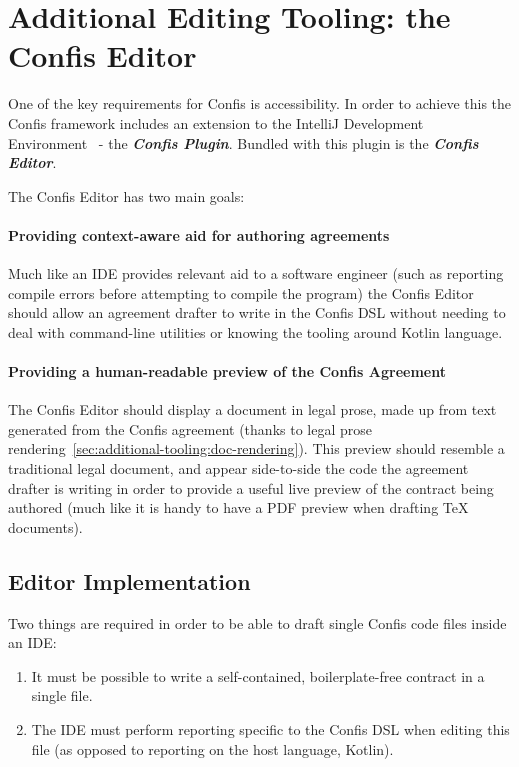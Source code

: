 \section[The Confis Editor]{Additional Editing Tooling: the Confis Editor}\label{sec:confis-editor}

One of the key requirements for Confis is accessibility.
In order to achieve this the Confis framework includes an extension to the IntelliJ Development Environment~\cite{intelliJRepo} - the \textbf{\emph{Confis Plugin}}.
Bundled with this plugin is the \textbf{\emph{Confis Editor}}.

The Confis Editor has two main goals:

\paragraph{Providing context-aware aid for authoring agreements} Much like an IDE provides relevant aid to a software engineer (such as reporting compile errors before attempting to compile the program) the Confis Editor should allow an agreement drafter to write in the Confis DSL without needing to deal with command-line utilities or knowing the tooling around Kotlin language.

\paragraph{Providing a human-readable preview of the Confis Agreement}

The Confis Editor should display a document in legal prose, made up from text generated from the Confis agreement (thanks to legal prose rendering~\ref{sec:additional-tooling:doc-rendering}).
This preview should resemble a traditional legal document, and appear side-to-side the code the agreement drafter is writing in order to provide a useful live preview of the contract being authored (much like it is handy to have a PDF preview when drafting TeX documents).

\subsection{Editor Implementation}\label{subsec:editor-implementation}

Two things are required in order to be able to draft single Confis code files inside an IDE:
\begin{enumerate}
    \item It must be possible to write a self-contained, boilerplate-free contract in a single file.
    \item The IDE must perform reporting specific to the Confis DSL when editing this file (as opposed to reporting on the host language, Kotlin).
\end{enumerate}

